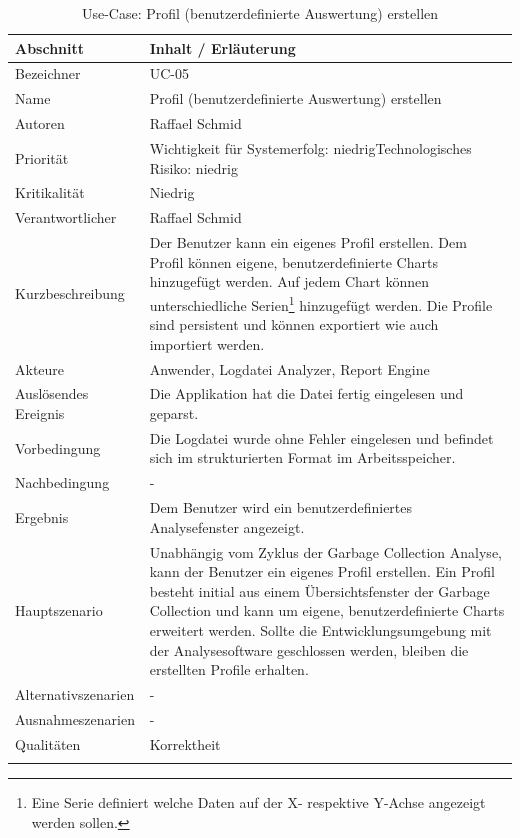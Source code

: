 \begin{longtable}{|p{4cm}|p{10.5cm}|}
\hline
   \textbf{Abschnitt} & \textbf{Inhalt / Erläuterung} \\\hline
   Bezeichner & UC-05\\\hline
   Name &Profil (benutzerdefinierte Auswertung) erstellen\\\hline
   Autoren & Raffael Schmid\\\hline
   Priorität & Wichtigkeit für Systemerfolg: niedrig\newline Technologisches Risiko: niedrig\\\hline
   Kritikalität & Niedrig\\\hline
   Verantwortlicher & Raffael Schmid\\\hline
   Kurzbeschreibung & Der Benutzer kann ein eigenes Profil erstellen. Dem Profil können eigene, benutzerdefinierte Charts hinzugefügt werden. Auf jedem Chart können unterschiedliche Serien\footnote{Eine Serie definiert welche Daten auf der X- respektive Y-Achse angezeigt werden sollen.} hinzugefügt werden. Die Profile sind persistent und können exportiert wie auch importiert werden.\\\hline
   Akteure & Anwender, Logdatei Analyzer, Report Engine\\\hline
   Auslösendes Ereignis & Die Applikation hat die Datei fertig eingelesen und geparst.\\\hline
   Vorbedingung & Die Logdatei wurde ohne Fehler eingelesen und befindet sich im strukturierten Format im Arbeitsspeicher.\\\hline
   Nachbedingung & -\\\hline
   Ergebnis & Dem Benutzer wird ein benutzerdefiniertes Analysefenster angezeigt.\\\hline
   Hauptszenario & Unabhängig vom Zyklus der Garbage Collection Analyse, kann der Benutzer ein eigenes Profil erstellen. Ein Profil besteht initial aus einem Übersichtsfenster der Garbage Collection und kann um eigene, benutzerdefinierte Charts erweitert werden. Sollte die Entwicklungsumgebung mit der Analysesoftware geschlossen werden, bleiben die erstellten Profile erhalten.\\\hline
   Alternativszenarien & -\\\hline
   Ausnahmeszenarien & -\\\hline
   Qualitäten & Korrektheit \\\hline
\caption{Use-Case: Profil (benutzerdefinierte Auswertung) erstellen }
\end{longtable}




